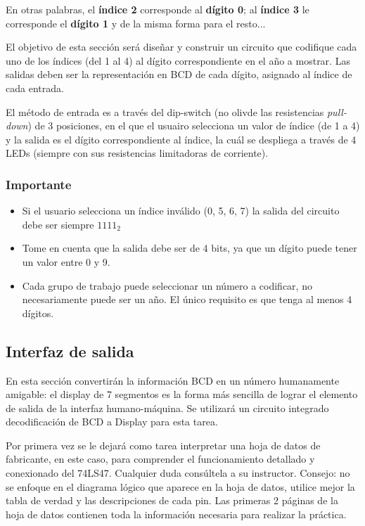 En otras palabras, el \textbf{índice 2} corresponde al \textbf{dígito 0}; al \textbf{índice 3} le corresponde el \textbf{dígito 1} y de la misma forma para el resto...

\vspace{14 pt}

El objetivo de esta sección será diseñar y construir un circuito que codifique cada uno de los índices (del 1 al 4) al dígito correspondiente en el año a mostrar.
Las salidas deben ser la representación en BCD de cada dígito, asignado al índice de cada entrada.

\vspace{14 pt}

El método de entrada es a través del dip-switch (no olivde las resistencias \emph{pull-down}) de 3 posiciones, en el que el usuairo
selecciona un valor de índice (de 1 a 4) y la salida es el dígito correspondiente al índice,
la cuál se despliega a través de 4 LEDs (siempre con sus resistencias limitadoras de corriente).

\subsubsection*{Importante}
\begin{itemize}
    \item Si el usuario selecciona un índice inválido (0, 5, 6, 7) la salida del circuito debe ser siempre $1111_2$
    \item Tome en cuenta que la salida debe ser de 4 bits, ya que un dígito puede tener un valor entre 0 y 9.
    \item Cada grupo de trabajo puede seleccionar un número a codificar, no necesariamente puede ser un año. El único requisito es que tenga al menos 4 dígitos.
\end{itemize}

\subsection{Interfaz de salida}
En esta sección convertirán la información BCD en un número humanamente amigable: el display de 7 segmentos es la forma más sencilla de lograr
el elemento de salida de la interfaz humano-máquina. Se utilizará un circuito integrado decodificación de BCD a Display para esta tarea.

Por primera vez se le dejará como tarea interpretar una hoja de datos de fabricante, en este caso, para comprender el funcionamiento detallado y
conexionado del 74LS47. Cualquier duda consúltela a su instructor. Consejo: no se enfoque en el diagrama lógico que aparece en la hoja de datos,
utilice mejor la tabla de verdad y las descripciones de cada pin. Las primeras 2 páginas de la hoja de datos contienen toda la información necesaria
para realizar la práctica.

